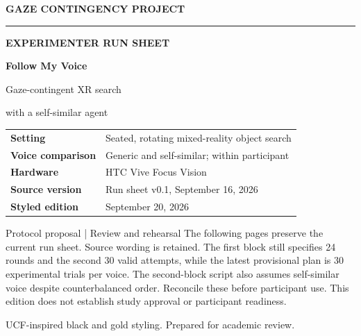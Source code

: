 \documentclass[11pt]{article}
\begin{document}
\hypersetup{pageanchor=false}
\begin{titlepage}
\thispagestyle{empty}
\vspace*{0.45in}
{\small\bfseries\color{UCFGray}GAZE CONTINGENCY PROJECT\par}
\vspace{0.15in}
{\color{UCFGold}\rule{\linewidth}{4pt}}
\vspace{0.25in}
\begin{tcolorbox}[colback=UCFDark,colframe=UCFDark,arc=0mm,left=20pt,right=20pt,top=28pt,bottom=28pt]
{\color{UCFGold}\small\bfseries EXPERIMENTER RUN SHEET\par}
\vspace{12pt}
{\color{white}\fontsize{34}{39}\selectfont\bfseries Follow My Voice\par}
\vspace{12pt}
{\color{white}\Large Gaze-contingent XR search\par with a self-similar agent\par}
\end{tcolorbox}
\vspace{0.25in}
\begin{tabularx}{\linewidth}{@{}lX@{}}
\textbf{Setting} & Seated, rotating mixed-reality object search \\[8pt]
\textbf{Voice comparison} & Generic and self-similar; within participant \\[8pt]
\textbf{Hardware} & HTC Vive Focus Vision \\[8pt]
\textbf{Source version} & Run sheet v0.1, September 16, 2026 \\[8pt]
\textbf{Styled edition} & September 20, 2026 \\
\end{tabularx}
\vfill
\begin{ucfcallout}{Protocol proposal | Review and rehearsal}
The following pages preserve the current run sheet. Source wording is retained. The first block still specifies 24 rounds and the second 30 valid attempts, while the latest provisional plan is 30 experimental trials per voice. The second-block script also assumes self-similar voice despite counterbalanced order. Reconcile these before participant use. This edition does not establish study approval or participant readiness.
\end{ucfcallout}
{\small\color{UCFGray}UCF-inspired black and gold styling. Prepared for academic review.}
\end{titlepage}
\hypersetup{pageanchor=true}

\end{document}
